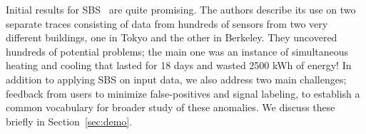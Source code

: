 Initial results for SBS~\cite{sbs:ipsn2013} are quite promising.  The authors describe its use on two separate traces consisting of data
from hundreds of sensors from two very different buildings, one in Tokyo and the other in Berkeley.   They uncovered hundreds
of potential problems; the main one was an instance of simultaneous heating and cooling that lasted for 18 days and wasted 2500 kWh of
energy!  In addition to applying SBS on input data, we also address two main challenges; feedback from users to minimize false-positives
and signal labeling, to establish a common vocabulary for broader study of these anomalies.  We discuss these briefly in Section~\ref{sec:demo}.

